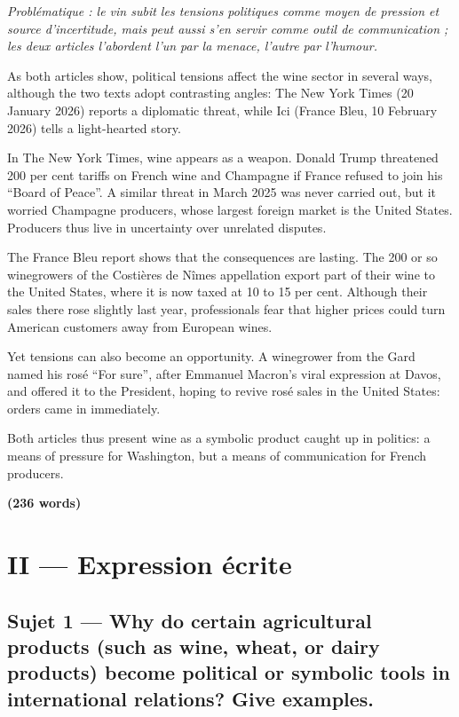 \documentclass[11pt,a4paper]{article}
\begin{document}
\emph{Problématique : le vin subit les tensions politiques comme moyen de pression et source d'incertitude, mais peut aussi s'en servir comme outil de communication ; les deux articles l'abordent l'un par la menace, l'autre par l'humour.}

As both articles show, political tensions affect the wine sector in several ways, although the two texts adopt contrasting angles: The New York Times (20 January 2026) reports a diplomatic threat, while Ici (France Bleu, 10 February 2026) tells a light-hearted story.

In The New York Times, wine appears as a weapon. Donald Trump threatened 200 per cent tariffs on French wine and Champagne if France refused to join his ``Board of Peace''. A similar threat in March 2025 was never carried out, but it worried Champagne producers, whose largest foreign market is the United States. Producers thus live in uncertainty over unrelated disputes.

The France Bleu report shows that the consequences are lasting. The 200 or so winegrowers of the Costières de Nîmes appellation export part of their wine to the United States, where it is now taxed at 10 to 15 per cent. Although their sales there rose slightly last year, professionals fear that higher prices could turn American customers away from European wines.

Yet tensions can also become an opportunity. A winegrower from the Gard named his rosé ``For sure'', after Emmanuel Macron's viral expression at Davos, and offered it to the President, hoping to revive rosé sales in the United States: orders came in immediately.

Both articles thus present wine as a symbolic product caught up in politics: a means of pressure for Washington, but a means of communication for French producers.

\textbf{(236 words)}

\hypertarget{ii-expression-uxe9crite}{%
\section{II --- Expression écrite}\label{ii-expression-uxe9crite}}

\hypertarget{sujet-1-why-do-certain-agricultural-products-such-as-wine-wheat-or-dairy-products-become-political-or-symbolic-tools-in-international-relations-give-examples.}{%
\subsection{Sujet 1 --- Why do certain agricultural products (such as wine, wheat, or dairy products) become political or symbolic tools in international relations? Give examples.}\label{sujet-1-why-do-certain-agricultural-products-such-as-wine-wheat-or-dairy-products-become-political-or-symbolic-tools-in-international-relations-give-examples.}}
\end{document}
